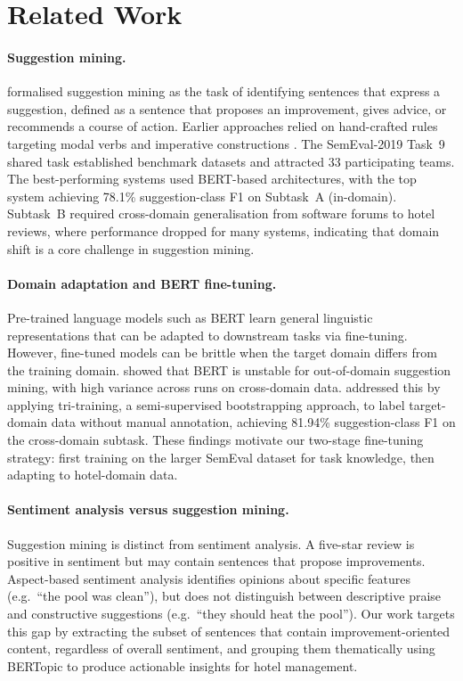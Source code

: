 \section{Related Work}

\paragraph{Suggestion mining.}
\citet{negi2018open} formalised suggestion mining as the task of identifying
sentences that express a suggestion, defined as a sentence that proposes an
improvement, gives advice, or recommends a course of action. Earlier approaches
relied on hand-crafted rules targeting modal verbs and imperative constructions
\citep{negi2017distant}. The SemEval-2019 Task~9 shared task
\citep{negi2019semeval} established benchmark datasets and attracted 33
participating teams. The best-performing systems used BERT-based architectures,
with the top system achieving 78.1\% suggestion-class F1 on Subtask~A
(in-domain). Subtask~B required cross-domain generalisation from software forums
to hotel reviews, where performance dropped for many systems, indicating that
domain shift is a core challenge in suggestion mining.

\paragraph{Domain adaptation and BERT fine-tuning.}
Pre-trained language models such as BERT \citep{devlin2019bert} learn general
linguistic representations that can be adapted to downstream tasks via
fine-tuning. However, fine-tuned models can be brittle when the target domain
differs from the training domain. \citet{park2019bert} showed that BERT is
unstable for out-of-domain suggestion mining, with high variance across runs on
cross-domain data. \citet{prasanna2019zoho} addressed this by applying
tri-training, a semi-supervised bootstrapping approach, to label target-domain
data without manual annotation, achieving 81.94\% suggestion-class F1 on the
cross-domain subtask. These findings motivate our two-stage fine-tuning
strategy: first training on the larger SemEval dataset for task knowledge, then
adapting to hotel-domain data.

\paragraph{Sentiment analysis versus suggestion mining.}
Suggestion mining is distinct from sentiment analysis. A five-star review is
positive in sentiment but may contain sentences that propose improvements.
Aspect-based sentiment analysis identifies opinions about specific features
(e.g.\ ``the pool was clean''), but does not distinguish between descriptive
praise and constructive suggestions (e.g.\ ``they should heat the pool''). Our
work targets this gap by extracting the subset of sentences that contain
improvement-oriented content, regardless of overall sentiment, and grouping
them thematically using BERTopic \citep{grootendorst2022bertopic} to produce
actionable insights for hotel management.
